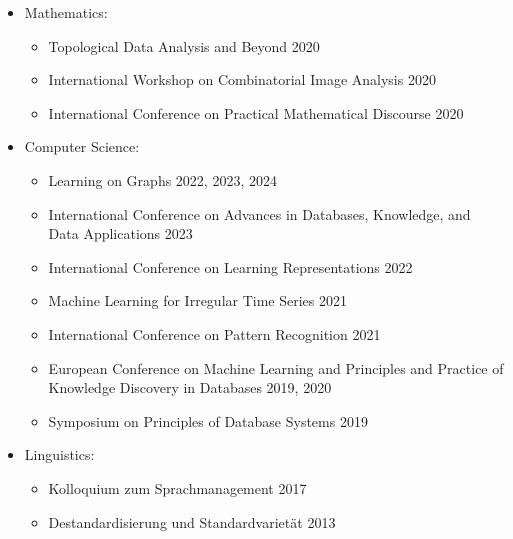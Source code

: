 \documentclass[a4paper, 11pt]{article}
\newcommand{\years}[1]{\marginnote{\scriptsize #1}}
\begin{document}
\years{Conferences}
\vspace{-10pt}
\begin{itemize}[noitemsep, leftmargin=*]
	\item Mathematics:
		\begin{itemize}[noitemsep, leftmargin=*]
			\item Topological Data Analysis and Beyond 2020
			\item International Workshop on Combinatorial Image Analysis 2020
			\item International Conference on Practical Mathematical Discourse 2020
		\end{itemize}
	\item Computer Science:
		\begin{itemize}[noitemsep, leftmargin=*]
			\item Learning on Graphs 2022, 2023, 2024
			\item International Conference on Advances in Databases, Knowledge, and Data Applications 2023
			\item International Conference on Learning Representations 2022
			\item Machine Learning for Irregular Time Series 2021
			\item International Conference on Pattern Recognition 2021
			\item European Conference on Machine Learning and Principles and Practice of Knowledge Discovery in Databases 2019, 2020
			\item Symposium on Principles of Database Systems 2019
		\end{itemize}
	\item Linguistics:
		\begin{itemize}[noitemsep, leftmargin=*]
			\item Kolloquium zum Sprachmanagement 2017
			\item Destandardisierung und Standardvarietät 2013
		\end{itemize}
\end{itemize}
\vspace{10pt}
\end{document}
